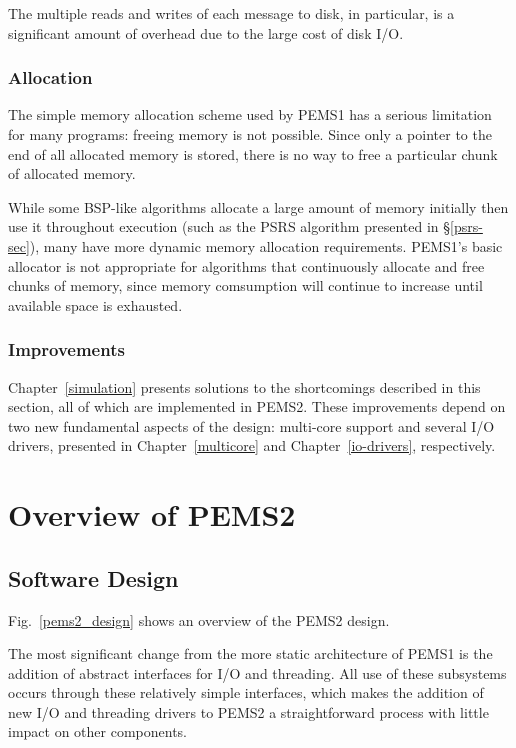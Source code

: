 \documentclass[12pt]{carletoncsthesis}
\begin{document}
The multiple reads and writes of each message to disk, in particular, is a
significant amount of overhead due to the large cost of disk I/O.

\subsection{Allocation}
\label{improvements-alloc}


The simple memory allocation scheme used by PEMS1 has a serious limitation
for many programs: freeing memory is not possible.  Since only a pointer
to the end of all allocated memory is stored, there is no way to free a
particular chunk of allocated memory.

While some BSP-like algorithms allocate a large amount of memory initially
then use it throughout execution (such as the PSRS algorithm presented in
\S\ref{psrs-sec}), many have more dynamic memory allocation requirements.
PEMS1's basic allocator is not appropriate for algorithms that continuously
allocate and free chunks of memory, since memory comsumption will continue
to increase until available space is exhausted.

\subsection{Improvements}


Chapter~\ref{simulation} presents solutions to the shortcomings described in
this section, all of which are implemented in PEMS2.  These improvements depend
on two new fundamental aspects of the design: multi-core support and several
I/O drivers, presented in Chapter~\ref{multicore} and Chapter~\ref{io-drivers},
respectively.


\chapter{Overview of PEMS2}
\thispagestyle{empty}
\label{overview-ch}


\section{Software Design}


Fig.~\ref{pems2_design} shows an overview of the PEMS2 design.

The most significant change from the more static architecture of PEMS1 is
the addition of abstract interfaces for I/O and threading.  All use of these
subsystems occurs through these relatively simple interfaces, which makes
the addition of new I/O and threading drivers to PEMS2 a straightforward
process with little impact on other components.
\end{document}
